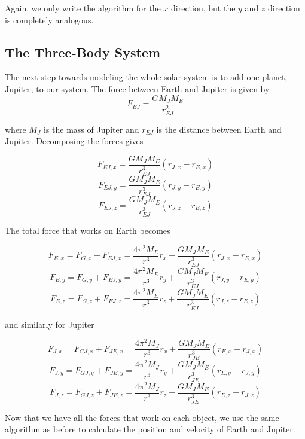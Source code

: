 \documentclass{article}
\begin{document}
\vskip0.5cm
\begin{algorithm}[H]
\end{algorithm}
\vskip0.5cm


Again, we only write the algorithm for the $x$ direction, but the $y$ and $z$ direction is completely analogous.


\subsection{The Three-Body System}

The next step towards modeling the whole solar system is to add one planet, Jupiter, to our system. The force between Earth and Jupiter is given by
$$F_{EJ}=\frac{GM_JM_E}{r_{EJ}^2}$$

where $M_J$ is the mass of Jupiter and $r_{EJ}$ is the distance between Earth and Jupiter. Decomposing the forces gives

$$F_{EJ,x}=\frac{GM_JM_E}{r_{EJ}^3}(r_{J,x}-r_{E,x})$$
$$F_{EJ,y}=\frac{GM_JM_E}{r_{EJ}^3}(r_{J,y}-r_{E,y})$$
$$F_{EJ,z}=\frac{GM_JM_E}{r_{EJ}^3}(r_{J,z}-r_{E,z})$$

The total force that works on Earth becomes

$$F_{E,x}=F_{G,x}+F_{EJ,x}=\frac{4\pi^2M_E}{r^3}r_x+\frac{GM_JM_E}{r_{EJ}^3}(r_{J,x}-r_{E,x})$$
$$F_{E,y}=F_{G,y}+F_{EJ,y}=\frac{4\pi^2M_E}{r^3}r_y+\frac{GM_JM_E}{r_{EJ}^3}(r_{J,y}-r_{E,y})$$
$$F_{E,z}=F_{G,z}+F_{EJ,z}=\frac{4\pi^2M_E}{r^3}r_z+\frac{GM_JM_E}{r_{EJ}^3}(r_{J,z}-r_{E,z})$$

and similarly for Jupiter

$$F_{J,x}=F_{GJ,x}+F_{JE,x}=\frac{4\pi^2M_J}{r^3}r_x+\frac{GM_JM_E}{r_{JE}^3}(r_{E,x}-r_{J,x})$$
$$F_{J,y}=F_{GJ,y}+F_{JE,y}=\frac{4\pi^2M_J}{r^3}r_y+\frac{GM_JM_E}{r_{JE}^3}(r_{E,y}-r_{J,y})$$
$$F_{J,z}=F_{GJ,z}+F_{JE,z}=\frac{4\pi^2M_J}{r^3}r_z+\frac{GM_JM_E}{r_{JE}^3}(r_{E,z}-r_{J,z})$$

Now that we have all the forces that work on each object, we use the same algorithm as before to calculate the position and velocity of Earth and Jupiter.
\end{document}

